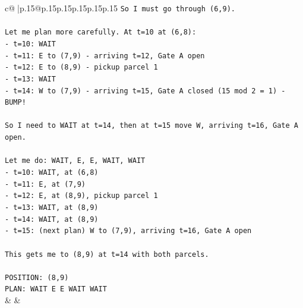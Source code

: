 \documentclass{article}
\begin{document}
{\begin{supertabular}{c@{$\;$}|p{.15\linewidth}@{}p{.15\linewidth}p{.15\linewidth}p{.15\linewidth}p{.15\linewidth}p{.15\linewidth}}
{{{\texttt{So I must go through (6,9).} \\
\\ 
\texttt{Let me plan more carefully. At t=10 at (6,8):} \\
\texttt{{-} t=10: WAIT} \\
\texttt{{-} t=11: E to (7,9) {-} arriving t=12, Gate A open} \\
\texttt{{-} t=12: E to (8,9) {-} pickup parcel 1} \\
\texttt{{-} t=13: WAIT  } \\
\texttt{{-} t=14: W to (7,9) {-} arriving t=15, Gate A closed (15 mod 2 = 1) {-} BUMP!} \\
\\ 
\texttt{So I need to WAIT at t=14, then at t=15 move W, arriving t=16, Gate A open.} \\
\\ 
\texttt{Let me do: WAIT, E, E, WAIT, WAIT} \\
\texttt{{-} t=10: WAIT, at (6,8)} \\
\texttt{{-} t=11: E, at (7,9)} \\
\texttt{{-} t=12: E, at (8,9), pickup parcel 1} \\
\texttt{{-} t=13: WAIT, at (8,9)} \\
\texttt{{-} t=14: WAIT, at (8,9)} \\
\texttt{{-} t=15: (next plan) W to (7,9), arriving t=16, Gate A open} \\
\\ 
\texttt{This gets me to (8,9) at t=14 with both parcels.} \\
\\ 
\texttt{POSITION: (8,9)} \\
\texttt{PLAN: WAIT E E WAIT WAIT} \\
            }
        }
    }
    & & \\ \\


\end{supertabular}}
\end{document}
